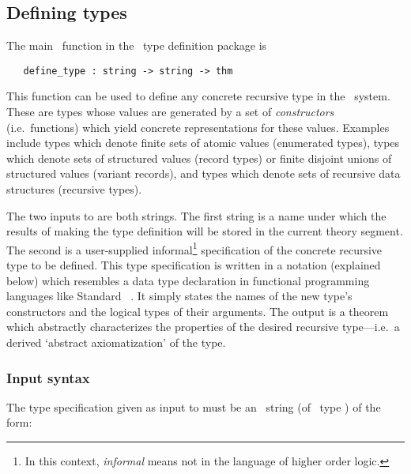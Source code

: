 \subsection{Defining types}

The main \ML\ function in the \HOL\ type definition package is

\begin{boxed}
\begin{verbatim}
   define_type : string -> string -> thm
\end{verbatim}\end{boxed}

\noindent This function can be used to define any concrete recursive type in
the \HOL\ system.  These are types whose values are generated by a set of {\it
constructors\/} (i.e.\ functions) which yield concrete representations for
these values.  Examples include types which denote finite sets of atomic values
(enumerated types), types which denote sets of structured values (record types)
or finite disjoint unions of structured values (variant records), and types
which denote sets of recursive data structures (recursive types).

The two inputs to  are both strings.  The first string
is a name  under which the results of making
the type definition will be stored in the current theory segment. The second is
a user-supplied informal\footnote{ In this context, {\it informal\/} means not
in the language of higher order logic.} specification of the concrete
recursive type to be defined.  This type specification is written in
a notation (explained below) which resembles
a data type declaration in functional programming languages like Standard
\ML~\cite{sml}.  It simply states the names of the new type's
constructors and the logical types of their \mbox{arguments.}  The output is a
theorem which abstractly characterizes the properties of
the desired recursive type---i.e.\ a
derived `abstract axiomatization' of the type.

\subsubsection{Input syntax}

The type specification given as input to 
must be an \ML\ string (of \ML\ type ) of the form:

